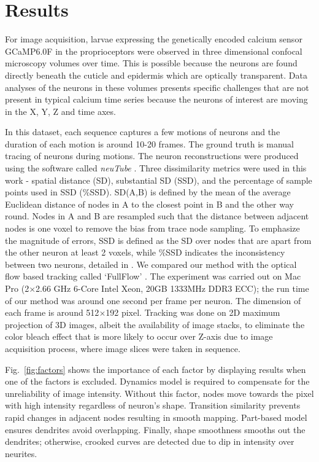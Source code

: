 \documentclass{article}
\begin{document}
\section{Results}
\label{sec:results}
For image acquisition, larvae expressing the genetically encoded calcium sensor GCaMP6.0F in the proprioceptors were observed in three dimensional confocal microscopy volumes over time. This is possible because the neurons are found directly beneath the cuticle and epidermis which are optically transparent. Data analyses of the neurons in these volumes presents specific challenges that are not present in typical calcium time series because the neurons of interest are moving in the X, Y, Z and time axes. 

In this dataset, each sequence captures a few motions of neurons and the duration of each motion is around 10-20 frames. The ground truth is manual tracing of neurons during motions. The neuron reconstructions were produced using the software called \emph{neuTube} \cite{Feng2015}. Three dissimilarity metrics were used in this work - spatial distance (SD), substantial SD (SSD), and the percentage of sample points used in SSD (\%SSD). SD(A,B) is defined by the mean of the average Euclidean distance of nodes in A to the closest point in B and the other way round. Nodes in A and B are resampled such that the distance between adjacent nodes is one voxel to remove the bias from trace node sampling. To emphasize the magnitude of errors, SSD is defined as the SD over nodes that are apart from the other neuron at least 2 voxels, while \%SSD indicates the inconsistency between two neurons, detailed in \cite{Peng2010}. We compared our method with the optical flow based tracking called `FullFlow' \cite{Chen2016}. The experiment was carried out on Mac Pro (2$\times$2.66 GHz 6-Core Intel Xeon, 20GB 1333MHz DDR3 ECC); the run time of our method was around one second per frame per neuron. The dimension of each frame is around 512$\times$192 pixel. Tracking was done on 2D maximum projection of 3D images, albeit the availability of image stacks, to eliminate the color bleach effect that is more likely to occur over Z-axis due to image acquisition process, where image slices were taken in sequence.

Fig.~\ref{fig:factors} shows the importance of each factor by displaying results when one of the factors is excluded. Dynamics model is required to compensate for the unreliability of image intensity. Without this factor, nodes move towards the pixel with high intensity regardless of neuron's shape. Transition similarity prevents rapid changes in adjacent nodes resulting in smooth mapping. Part-based model ensures dendrites avoid overlapping. Finally, shape smoothness smooths out the dendrites; otherwise, crooked curves are detected due to dip in intensity over neurites. 
\end{document}
